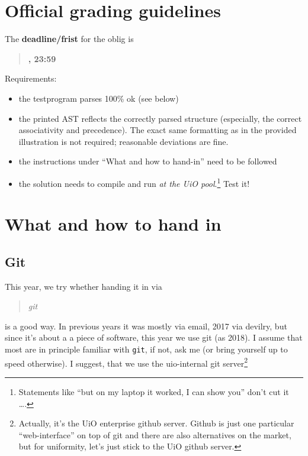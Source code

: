 \documentclass[10pt,freeform]{handout}[2014/08/13]
\begin{document}
\thispagestyle{empty}

\section{Official grading guidelines}
\label{sec:official-info}




\hrulefill{}

The \textbf{deadline/frist}  for the oblig is

\begin{quote}
  \textbf{\deadlineone, 23:59}
\end{quote}

Requirements:


\begin{itemize}
\item the testprogram parses 100\% ok (see below)
\item the printed AST reflects the correctly parsed structure (especially,
  the correct associativity and precedence). The exact same formatting as
  in the provided illustration is not required; reasonable deviations are
  fine.
\item the instructions under ``What and how to  hand-in'' need to be followed
\item the solution needs to compile and run \emph{at the UiO
    pool}.\footnote{Statements like ``but on my laptop it worked, I can show
    you'' don't cut it \ldots.} Test it!
\end{itemize}

\hrulefill




\section{What and how to hand in}
\label{sec:what-how}


\subsection{Git}
\label{sec:git}



This year, we try whether handing it in via 
\begin{quote}
  \textsl{git}   
\end{quote}
is a good way. In previous years it was mostly via email, 2017 via devilry,
but since it's about a a piece of software, this year we use git (as 2018).
I assume that most are in principle familiar with \texttt{git}, if not, ask
me (or bring yourself up to speed otherwise).  I suggest, that we use the
uio-internal git server\footnote{Actually, it's the UiO enterprise github
  server. Github is just one particular ``web-interface'' on top of git and
  there are also alternatives on the market, but for uniformity, let's just
  stick to the UiO github server.}
\end{document}
